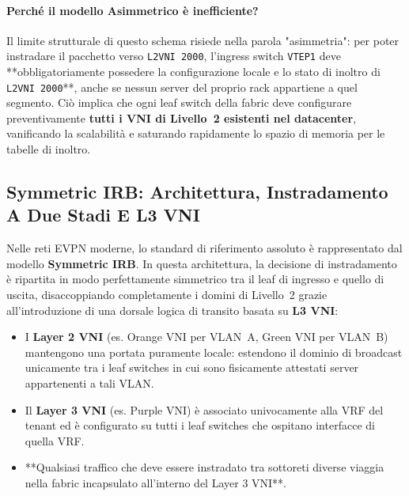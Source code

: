 \documentclass[11pt, a4paper]{article}
\begin{document}
\paragraph{Perché il modello Asimmetrico è inefficiente?}
Il limite strutturale di questo schema risiede nella parola "asimmetria": per poter instradare il pacchetto verso \texttt{L2VNI 2000}, l'ingress switch \texttt{VTEP1} deve **obbligatoriamente possedere la configurazione locale e lo stato di inoltro di \texttt{L2VNI 2000}**, anche se nessun server del proprio rack appartiene a quel segmento. Ciò implica che ogni leaf switch della fabric deve configurare preventivamente \textbf{tutti i VNI di Livello~2 esistenti nel datacenter}, vanificando la scalabilità e saturando rapidamente lo spazio di memoria per le tabelle di inoltro.

\subsection{Symmetric IRB: Architettura, Instradamento A Due Stadi E L3 VNI}

Nelle reti EVPN moderne, lo standard di riferimento assoluto è rappresentato dal modello \textbf{Symmetric IRB}. In questa architettura, la decisione di instradamento è ripartita in modo perfettamente simmetrico tra il leaf di ingresso e quello di uscita, disaccoppiando completamente i domini di Livello~2 grazie all'introduzione di una dorsale logica di transito basata su \textbf{L3 VNI}:


\begin{itemize}
    \item I \textbf{Layer 2 VNI} (es. Orange VNI per VLAN~A, Green VNI per VLAN~B) mantengono una portata puramente locale: estendono il dominio di broadcast unicamente tra i leaf switches in cui sono fisicamente attestati server appartenenti a tali VLAN.
    \item Il \textbf{Layer 3 VNI} (es. Purple VNI) è associato univocamente alla VRF del tenant ed è configurato su tutti i leaf switches che ospitano interfacce di quella VRF.
    \item **Qualsiasi traffico che deve essere instradato tra sottoreti diverse viaggia nella fabric incapsulato all'interno del Layer 3 VNI**.
\end{itemize}
\end{document}
